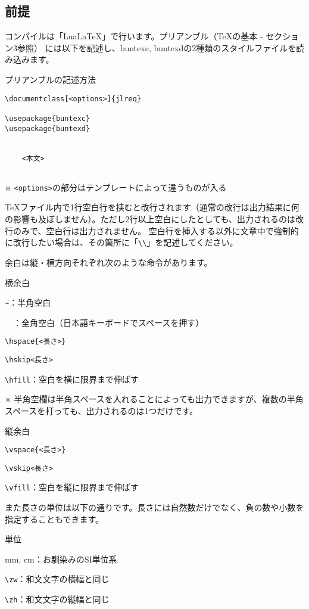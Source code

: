 \begin{multicols*}{2}
\section{前提}
コンパイルは「Lua\LaTeX 」で行います。プリアンブル（\TeX の基本 - セクション3参照）
には以下を記述し、buntexc, buntexdの2種類のスタイルファイルを読み込みます。
\begin{framebox-simple}{プリアンブルの記述方法}
\begin{verbatim}
\documentclass[<options>]{jlreq}

\usepackage{buntexc}
\usepackage{buntexd}


    <本文>


\end{verbatim}
※ \verb|<options>|の部分はテンプレートによって違うものが入る
\end{framebox-simple}
\TeX ファイル内で1行空白行を挟むと改行されます（通常の改行は出力結果に何の影響も及ぼしません）。ただし2行以上空白にしたとしても、出力されるのは改行のみで、空白行は出力されません。
空白行を挿入する以外に文章中で強制的に改行したい場合は、その箇所に「\verb|\\|」を記述してください。

余白は縦・横方向それぞれ次のような命令があります。
\begin{framebox-simple}{横余白}
\begin{reitemize}
    \item \verb|~|：半角空白
    \item 　：全角空白（日本語キーボードでスペースを押す）
    \item \verb|\hspace{<長さ>}|
    \item \verb|\hskip<長さ>|
    \item \verb|\hfill|：空白を横に限界まで伸ばす
\end{reitemize}
※ 半角空欄は半角スペースを入れることによっても出力できますが、複数の半角スペースを打っても、出力されるのは1つだけです。
\end{framebox-simple}
\begin{framebox-simple}{縦余白}
    \begin{reitemize}
        \item \verb|\vspace{<長さ>}|
        \item \verb|\vskip<長さ>|
        \item \verb|\vfill|：空白を縦に限界まで伸ばす
    \end{reitemize}
\end{framebox-simple}
また長さの単位は以下の通りです。長さには自然数だけでなく、負の数や小数を指定することもできます。
\begin{framebox-simple}{単位}
    \begin{reitemize}
        \item mm, cm：お馴染みのSI単位系
        \item \verb|\zw|：和文文字の横幅と同じ
        \item \verb|\zh|：和文文字の縦幅と同じ
    \end{reitemize}
\end{framebox-simple}


\end{multicols*}
